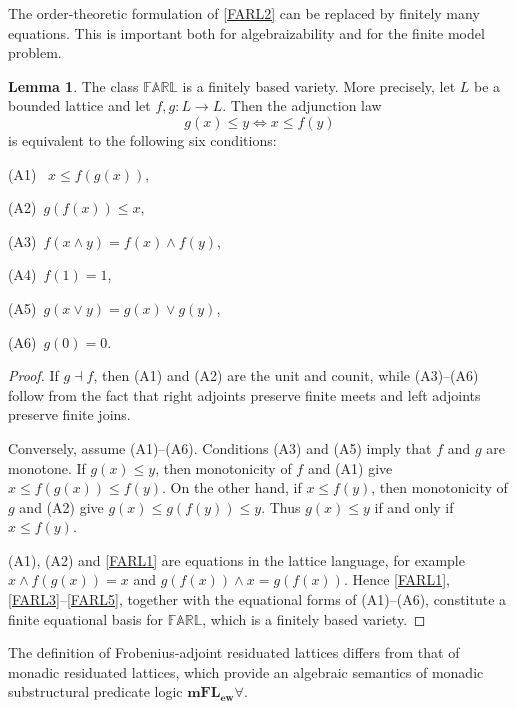 \documentclass[final,12pt,times]{elsarticle}
\theoremstyle{plain}
\theoremstyle{definition}
\newtheorem{lemma}[definition]{Lemma}
\theoremstyle{break}
\newcommand{\FARL}{\mathbb{FARL}}
\begin{document}
The order-theoretic formulation of \eqref{FARL2} can be replaced by finitely many equations. This is
important both for algebraizability and for the finite model problem.

\begin{lemma}\label{lem:FARL-equational-adjunction} The class $\FARL$ is a finitely based variety. More precisely,
let $L$ be a bounded lattice and let $f,g:L\to L$.  Then the adjunction law
\[
 g(x)\le y\Longleftrightarrow x\le f(y)
\]
is equivalent to the following six conditions:

(A1)~ $x\le f(g(x))$,

 (A2)~$g(f(x))\le x$, 
 
 (A3)~$f(x\wedge y)=f(x)\wedge f(y)$, 
 
 (A4)~$f(1)=1$, 
 
 (A5)~$g(x\vee y)=g(x)\vee g(y)$, 
 
 (A6)~$g(0)=0$. 
\end{lemma}

\begin{proof}
If $g\dashv f$, then (A1) and (A2) are the unit and counit, while (A3)--(A6)
follow from the fact that right adjoints preserve finite meets and left adjoints
preserve finite joins.

Conversely, assume (A1)--(A6).  Conditions (A3) and (A5) imply that $f$ and
$g$ are monotone.  If $g(x)\le y$, then monotonicity of $f$ and (A1) give
$x\le f(g(x))\le f(y)$.
On the other hand, if $x\le f(y)$, then monotonicity of $g$ and (A2) give
 $g(x)\le g(f(y))\le y$. Thus $g(x)\le y$ if and only if $x\le f(y)$.

(A1), (A2) and \eqref{FARL1} are equations in the lattice
language, for example
$x\wedge f(g(x))=x$ and $g(f(x))\wedge x=g(f(x))$.  Hence
\eqref{FARL1}, \eqref{FARL3}--\eqref{FARL5}, together with the equational
forms of (A1)--(A6), constitute a finite equational basis for
$\FARL$, which is a finitely based variety.
\end{proof}

The definition of Frobenius-adjoint residuated lattices differs from that of monadic residuated lattices, which provide an algebraic semantics of monadic substructural predicate logic $\mathbf{mFL_{ew}\forall}$.
\end{document}
